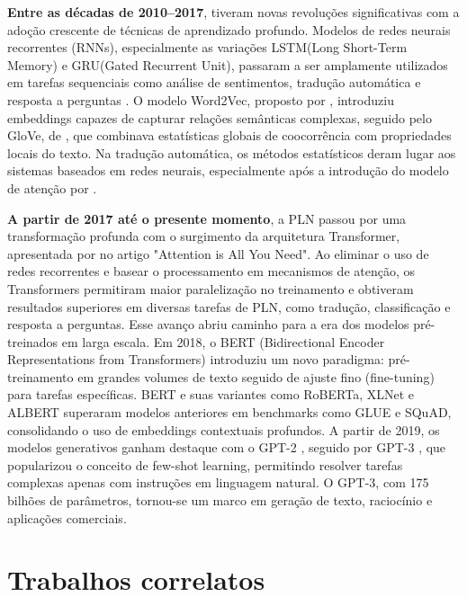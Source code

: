 \textbf{Entre as décadas de 2010–2017}, tiveram novas revoluções significativas com a adoção crescente de técnicas de aprendizado profundo. Modelos de redes neurais recorrentes (RNNs), especialmente as variações LSTM(Long Short-Term Memory) e GRU(Gated Recurrent Unit), passaram a ser amplamente utilizados em tarefas sequenciais como análise de sentimentos, tradução automática e resposta a perguntas \cite{tang2015lstm , cho2014rnn}. O modelo Word2Vec, proposto por \textcite{mikolov2013word2vec}, introduziu embeddings capazes de capturar relações semânticas complexas, seguido pelo GloVe, de \textcite{pennington2014glove}, que combinava estatísticas globais de coocorrência com propriedades locais do texto. Na tradução automática, os métodos estatísticos deram lugar aos sistemas baseados em redes neurais, especialmente após a introdução do modelo de atenção por \textcite{bahdanau2015attention}.

\textbf{A partir de 2017 até o presente momento}, a PLN passou por uma transformação profunda com o surgimento da arquitetura Transformer, apresentada por \cite{vaswani2017attention} no artigo "Attention is All You Need". Ao eliminar o uso de redes recorrentes e basear o processamento em mecanismos de atenção, os Transformers permitiram maior paralelização no treinamento e obtiveram resultados superiores em diversas tarefas de PLN, como tradução, classificação e resposta a perguntas. Esse avanço abriu caminho para a era dos modelos pré-treinados em larga escala. Em 2018, o BERT (Bidirectional Encoder Representations from Transformers) \cite{devlin2018bert} introduziu um novo paradigma: pré-treinamento em grandes volumes de texto seguido de ajuste fino (fine-tuning) para tarefas específicas. BERT e suas variantes como RoBERTa, XLNet e ALBERT superaram modelos anteriores em benchmarks como GLUE e SQuAD, consolidando o uso de embeddings contextuais profundos. A partir de 2019, os modelos generativos ganham destaque com o GPT-2 \cite{radford2019gpt2}, seguido por GPT-3 \cite{brown2020language}, que popularizou o conceito de few-shot learning, permitindo resolver tarefas complexas apenas com instruções em linguagem natural. O GPT-3, com 175 bilhões de parâmetros, tornou-se um marco em geração de texto, raciocínio e aplicações comerciais.


\section{Trabalhos correlatos}\label{correlatos}

